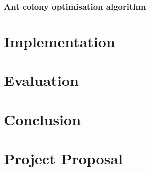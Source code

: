 \documentclass[12pt,twoside,notitlepage]{report}
\begin{document}
\subsection{Ant colony optimisation algorithm}

\cleardoublepage
\chapter{Implementation}



\cleardoublepage
\chapter{Evaluation}

\cleardoublepage
\chapter{Conclusion}

\cleardoublepage


\nocite*{}
\cleardoublepage

\appendix

\cleardoublepage


\cleardoublepage

\chapter{Project Proposal}


\end{document}
